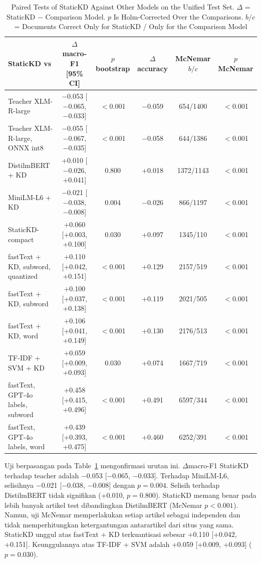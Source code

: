 \documentclass[journal]{IEEEtran}
\begin{document}
\begin{table}[!t]
\caption{Paired Tests of StaticKD Against Other Models on the Unified Test Set. $\Delta$ = StaticKD $-$ Comparison Model. $p$ Is Holm-Corrected Over the Comparisons. $b/c$ = Documents Correct Only for StaticKD / Only for the Comparison Model}
\label{tab:sig}
\centering
\footnotesize
\begin{tabular}{@{}lccccc@{}}
\toprule
StaticKD vs & $\Delta$macro-F1 [95\% CI] & $p$ bootstrap & $\Delta$accuracy & McNemar $b/c$ & $p$ McNemar \\
\midrule
Teacher XLM-R-large & $-$0.053 [$-$0.065, $-$0.033] & $<$0.001 & $-$0.059 & 654/1400 & $<$0.001 \\
Teacher XLM-R-large, ONNX int8 & $-$0.055 [$-$0.067, $-$0.035] & $<$0.001 & $-$0.058 & 644/1386 & $<$0.001 \\
DistilmBERT + KD & +0.010 [$-$0.026, +0.041] & 0.800 & +0.018 & 1372/1143 & $<$0.001 \\
MiniLM-L6 + KD & $-$0.021 [$-$0.038, $-$0.008] & 0.004 & $-$0.026 & 866/1197 & $<$0.001 \\
StaticKD-compact & +0.060 [+0.003, +0.100] & 0.030 & +0.097 & 1345/110 & $<$0.001 \\
fastText + KD, subword, quantized & +0.110 [+0.042, +0.151] & $<$0.001 & +0.129 & 2157/519 & $<$0.001 \\
fastText + KD, subword & +0.100 [+0.037, +0.138] & $<$0.001 & +0.119 & 2021/505 & $<$0.001 \\
fastText + KD, word & +0.106 [+0.041, +0.149] & $<$0.001 & +0.130 & 2176/513 & $<$0.001 \\
TF-IDF + SVM + KD & +0.059 [+0.009, +0.093] & 0.030 & +0.074 & 1667/719 & $<$0.001 \\
fastText, GPT-4o labels, subword & +0.458 [+0.415, +0.496] & $<$0.001 & +0.491 & 6597/344 & $<$0.001 \\
fastText, GPT-4o labels, word & +0.439 [+0.393, +0.475] & $<$0.001 & +0.460 & 6252/391 & $<$0.001 \\
\bottomrule
\end{tabular}
\end{table}
Uji berpasangan pada Table~\ref{tab:sig} mengonfirmasi urutan ini. $\Delta$macro-F1 StaticKD terhadap teacher adalah $-$0.053 [$-$0.065, $-$0.033]. Terhadap MiniLM-L6, selisihnya $-$0.021 [$-$0.038, $-$0.008] dengan $p=0.004$. Selisih terhadap DistilmBERT tidak signifikan (+0.010, $p=0.800$). StaticKD memang benar pada lebih banyak artikel test dibandingkan DistilmBERT (McNemar $p<0.001$). Namun, uji McNemar memperlakukan setiap artikel sebagai independen dan tidak memperhitungkan ketergantungan antarartikel dari situs yang sama. StaticKD unggul atas fastText + KD terkuantisasi sebesar +0.110 [+0.042, +0.151]. Keunggulannya atas TF-IDF + SVM adalah +0.059 [+0.009, +0.093] ($p=0.030$).
\end{document}

